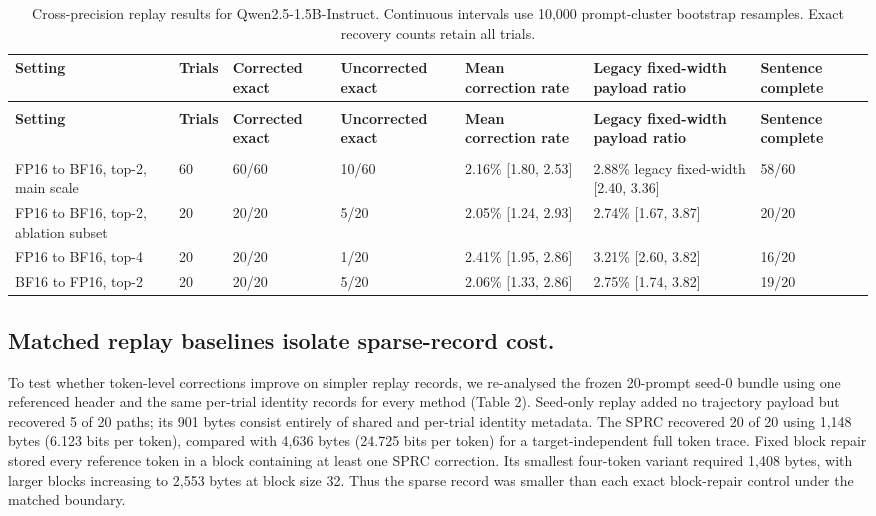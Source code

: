 \documentclass{nature}
\begin{document}
\clearpage
\begingroup
\scriptsize
\setlength{\tabcolsep}{2.5pt}
\renewcommand{\arraystretch}{1.22}
\begin{xltabular}{\textwidth}{@{}>{\raggedright\arraybackslash}X *{6}{Y}@{}}
\caption{Cross-precision replay results for Qwen2.5-1.5B-Instruct. Continuous intervals use 10,000 prompt-cluster bootstrap resamples. Exact recovery counts retain all trials.}\label{tab:1} \\
\toprule
\textbf{Setting} & \textbf{Trials} & \textbf{Corrected exact} & \textbf{Uncorrected exact} & \textbf{Mean correction rate} & \textbf{Legacy fixed-width payload ratio} & \textbf{Sentence complete} \\
\midrule
\endfirsthead
{} \\
\toprule
\textbf{Setting} & \textbf{Trials} & \textbf{Corrected exact} & \textbf{Uncorrected exact} & \textbf{Mean correction rate} & \textbf{Legacy fixed-width payload ratio} & \textbf{Sentence complete} \\
\midrule
\endhead
\midrule
{} \\
\endfoot
\bottomrule
\endlastfoot
FP16 to BF16, top-2, main scale & 60 & 60/60 & 10/60 & 2.16\% [1.80, 2.53] & 2.88\% legacy fixed-width [2.40, 3.36] & 58/60 \\
FP16 to BF16, top-2, ablation subset & 20 & 20/20 & 5/20 & 2.05\% [1.24, 2.93] & 2.74\% [1.67, 3.87] & 20/20 \\
FP16 to BF16, top-4 & 20 & 20/20 & 1/20 & 2.41\% [1.95, 2.86] & 3.21\% [2.60, 3.82] & 16/20 \\
BF16 to FP16, top-2 & 20 & 20/20 & 5/20 & 2.06\% [1.33, 2.86] & 2.75\% [1.74, 3.82] & 19/20 \\
\end{xltabular}
\endgroup
\clearpage
\subsection{Matched replay baselines isolate sparse-record cost.}
To test whether token-level corrections improve on simpler replay records, we re-analysed the frozen 20-prompt seed-0 bundle using one referenced header and the same per-trial identity records for every method (Table 2). Seed-only replay added no trajectory payload but recovered 5 of 20 paths; its 901 bytes consist entirely of shared and per-trial identity metadata. The SPRC recovered 20 of 20 using 1,148 bytes (6.123 bits per token), compared with 4,636 bytes (24.725 bits per token) for a target-independent full token trace. Fixed block repair stored every reference token in a block containing at least one SPRC correction. Its smallest four-token variant required 1,408 bytes, with larger blocks increasing to 2,553 bytes at block size 32. Thus the sparse record was smaller than each exact block-repair control under the matched boundary.
\end{document}
